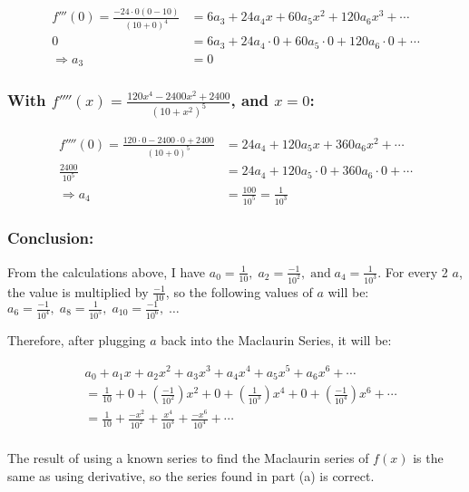 \documentclass[12pt]{article}
\begin{document}
\begin{align*}
    f'''(0)= \frac{-24\cdot 0\left(0- 10 \right)}{\left(10+ 0 \right)^4}
    &= 6a_3+ 24a_4x+ 60a_5x^2+ 120a_6x^3+ \cdots\\
    0 &= 6a_3+ 24a_4\cdot 0+ 60a_5\cdot 0+ 120a_6\cdot 0+ \cdots\\
    \Longrightarrow a_3 &= 0
\end{align*}


\subsubsection*{With $\displaystyle f''''(x)= \frac{120x^4- 2400x^2+ 2400}{\left(10+x^2 \right)^5}$, and $x=0$:}

\begin{align*}
    f''''(0)= \frac{120\cdot 0- 2400\cdot 0+ 2400}{\left(10+ 0 \right)^5}
    &= 24a_4+ 120a_5x+ 360a_6x^2+ \cdots\\
    \frac{2400}{10^5} &= 24a_4+ 120a_5\cdot 0+ 360a_6\cdot 0+ \cdots\\
    \Longrightarrow a_4 &= \frac{100}{10^5}= \frac{1}{10^3}
\end{align*}

\subsubsection*{Conclusion:}
\noindent From the calculations above, I have $\displaystyle a_0=\frac{1}{10},\; a_2=\frac{-1}{10^2},\; \text{and}\; a_4=\frac{1}{10^3}$. For every 2 $a$, the value is multiplied by $\displaystyle \frac{-1}{10}$, so the following values of $a$ will be: $\displaystyle a_6=\frac{-1}{10^4},\; a_8=\frac{1}{10^5},\; a_{10}=\frac{-1}{10^6},\; \dots$

\noindent Therefore, after plugging $a$ back into the Maclaurin Series, it will be:

\begin{align*}
    & a_0+ a_1x+ a_2x^2+ a_3x^3+ a_4x^4+ a_5x^5+ a_6x^6+ \cdots\\
    &= \frac{1}{10}
    + 0
    + \left(\frac{-1}{10^2} \right) x^2
    + 0
    + \left(\frac{1}{10^3} \right) x^4
    + 0
    + \left(\frac{-1}{10^4} \right) x^6
    + \cdots\\
    &= \frac{1}{10}
    + \frac{-x^2}{10^2}
    + \frac{x^4}{10^3}
    + \frac{-x^6}{10^4}
    + \cdots\\
\end{align*}

The result of using a known series to find the Maclaurin series of $f(x)$ is the same as using derivative, so the series found in part (a) is correct.
\end{document}
